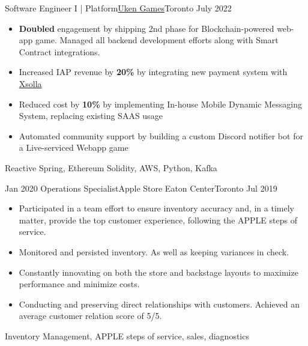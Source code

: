 %
%
%
\begin{experiences}
  \experienceCurrent
    {Software Engineer I | Platform}{\href{https://uken.com}{Uken Games}}{Toronto}
    {July 2022} {
                    \begin{itemize}
                        \setlength\itemsep{0.2em}
                        \item \textbf{Doubled} engagement by shipping 2nd phase for Blockchain-powered web-app game. Managed all backend development efforts along with Smart Contract integrations.

                        \item Increased IAP revenue by \textbf{20\%} by integrating new payment system with \href{https://xsolla.com}{Xsolla} 

                        \item Reduced cost by \textbf{10\%} by implementing In-house Mobile Dynamic Messaging System, replacing existing SAAS usage

                        \item Automated community support by building a custom Discord notifier bot for a Live-serviced Webapp game
                    \end{itemize}
                    }
                    {Reactive Spring, Ethereum Solidity, AWS, Python, Kafka}

  \emptySeparator
  \experience
    {Jan 2020}   {Operations Specialist}{Apple Store Eaton Center}{Toronto}
    {Jul 2019} {
                    \begin{itemize}
                        \setlength\itemsep{0.2em}
                        \item Participated in a team effort to ensure inventory accuracy and, in a timely matter, provide the top customer experience, following the APPLE steps of service.
                        
                        \item Monitored and persisted inventory. As well as keeping variances in check.

                        \item Constantly innovating on both the store and backstage layouts to maximize performance and minimize costs.

                        \item Conducting and preserving direct relationships with customers. Achieved an average customer relation score of 5/5.
                    \end{itemize}
                    }
                    {Inventory Management, APPLE steps of service, sales, diagnostics}
\end{experiences}
